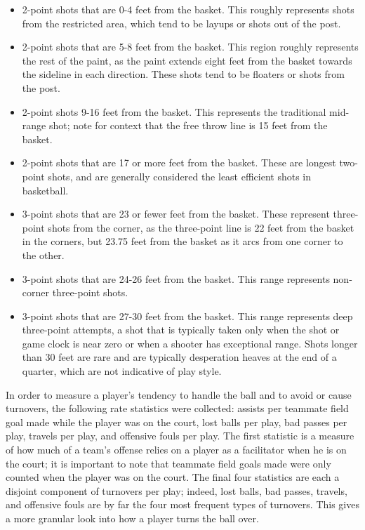 \begin{itemize}
    \item 2-point shots that are 0-4 feet from the basket. This roughly represents
        shots from the restricted area, which tend to be layups or shots out of the
        post.
    \item 2-point shots that are 5-8 feet from the basket. This region roughly
        represents the rest of the paint, as the paint extends eight feet from the
        basket towards the sideline in each direction. These shots tend to be
        floaters or shots from the post.
    \item 2-point shots 9-16 feet from the basket. This represents the traditional
        mid-range shot; note for context that the free throw line is 15 feet from
        the basket.
    \item 2-point shots that are 17 or more feet from the basket. These are longest
        two-point shots, and are generally considered the least efficient shots in
        basketball.
    \item 3-point shots that are 23 or fewer feet from the basket. These represent
        three-point shots from the corner, as the three-point line is 22 feet from
        the basket in the corners, but 23.75 feet from the basket as it arcs from
        one corner to the other.
    \item 3-point shots that are 24-26 feet from the basket. This range represents
        non-corner three-point shots.
    \item 3-point shots that are 27-30 feet from the basket. This range represents
        deep three-point attempts, a shot that is typically taken only when the shot
        or game clock is near zero or when a shooter has exceptional range. Shots
        longer than 30 feet are rare and are typically desperation heaves at the end
        of a quarter, which are not indicative of play style.
\end{itemize}

In order to measure a player's tendency to handle the ball and to avoid or cause
turnovers, the following rate statistics were collected: assists per teammate field
goal made while the player was on the court, lost balls per play, bad passes per
play, travels per play, and offensive fouls per play. The first statistic is a
measure of how much of a team's offense relies on a player as a facilitator when he
is on the court; it is important to note that teammate field goals made were only
counted when the player was on the court. The final four statistics are each a
disjoint component of turnovers per play; indeed, lost balls, bad passes, travels,
and offensive fouls are by far the four most frequent types of turnovers. This gives
a more granular look into how a player turns the ball over.

